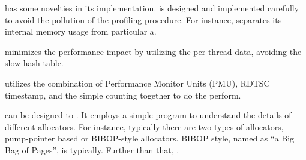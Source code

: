 \MP{} has some novelties in its implementation. \MP{} is designed and implemented carefully to avoid the pollution of the profiling procedure. For instance, \MP{} separates its internal memory usage from particular a. 

\MP{} minimizes the performance impact by utilizing the per-thread data, avoiding the slow hash table. 




\MP{} utilizes the combination of Performance Monitor Units (PMU), RDTSC timestamp, and the simple counting together to do the perform. 

\MP{} can be designed to . It employs a simple program to understand the details of different allocators. For instance, typically there are two types of allocators, pump-pointer based or BIBOP-style allocators. BIBOP style, named as ``a Big Bag of Pages'', is typically. Further than that, \MP{} .
